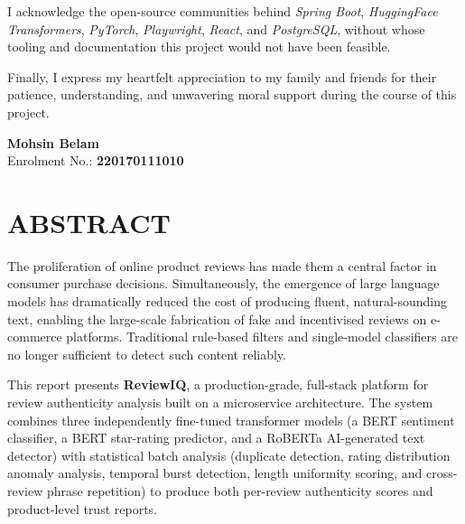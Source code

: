 \documentclass[12pt,a4paper,oneside]{report}
\begin{document}
I acknowledge the open-source communities behind \textit{Spring Boot},
\textit{HuggingFace Transformers}, \textit{PyTorch}, \textit{Playwright},
\textit{React}, and \textit{PostgreSQL}, without whose tooling and
documentation this project would not have been feasible.

Finally, I express my heartfelt appreciation to my family and friends for
their patience, understanding, and unwavering moral support during the course
of this project.

\vspace{2cm}
\begin{flushright}
\textbf{Mohsin Belam}\\
Enrolment No.: \textbf{220170111010}
\end{flushright}

\chapter*{ABSTRACT}
\thispagestyle{romanplain}

The proliferation of online product reviews has made them a central factor in
consumer purchase decisions. Simultaneously, the emergence of large language
models has dramatically reduced the cost of producing fluent, natural-sounding
text, enabling the large-scale fabrication of fake and incentivised reviews on
e-commerce platforms. Traditional rule-based filters and single-model
classifiers are no longer sufficient to detect such content reliably.

This report presents \textbf{ReviewIQ}, a production-grade, full-stack
platform for review authenticity analysis built on a microservice
architecture. The system combines three independently fine-tuned transformer
models (a BERT sentiment classifier, a BERT star-rating predictor, and a
RoBERTa AI-generated text detector) with statistical batch analysis
(duplicate detection, rating distribution anomaly analysis, temporal burst
detection, length uniformity scoring, and cross-review phrase repetition) to
produce both per-review authenticity scores and product-level trust reports.
\end{document}
